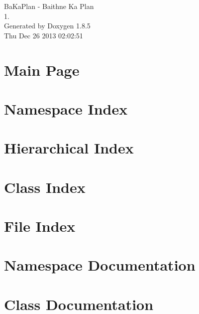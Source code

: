 \documentclass[twoside]{book}
\newcommand{\clearemptydoublepage}{%
  \newpage{\pagestyle{empty}\cleardoublepage}%
}
\begin{document}
\hypersetup{pageanchor=false}
\begin{titlepage}
\vspace*{7cm}
\begin{center}%
{\Large Ba\-Ka\-Plan -\/ Baithne Ka Plan \\[1ex]\large 1. }\\
\vspace*{1cm}
{\large Generated by Doxygen 1.8.5}\\
\vspace*{0.5cm}
{\small Thu Dec 26 2013 02:02:51}\\
\end{center}
\end{titlepage}
\clearemptydoublepage
\tableofcontents
\clearemptydoublepage
{}
\hypersetup{pageanchor=true}

\chapter{Main Page}
\label{index}\hypertarget{index}{}
\chapter{Namespace Index}

\chapter{Hierarchical Index}

\chapter{Class Index}

\chapter{File Index}

\chapter{Namespace Documentation}

\chapter{Class Documentation}




















\end{document}
